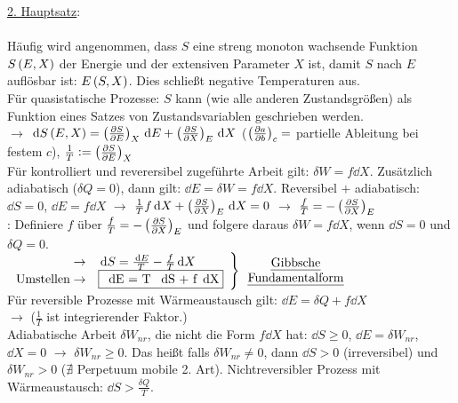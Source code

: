 \uline{2. Hauptsatz}:\\
\\
Häufig wird angenommen, dass $S$ eine streng monoton wachsende Funktion $S\left( E,X \right)$ der Energie und der extensiven Parameter $X$ ist, damit $S$ nach $E$ auflösbar ist: $E\left( S,X \right)$. Dies schließt negative Temperaturen aus.\\
Für quasistatische Prozesse: $S$ kann (wie alle anderen Zustandsgrößen) als Funktion eines Satzes von Zustandsvariablen geschrieben werden.\\
$\rightarrow$ $\,\text d{S}\left( E,X \right) = \left(\frac{\partial S}{\partial E}\right)_{X} \,\text d{E} + \left(\frac{\partial S}{\partial X}\right)_{E}\,\text d{X}$ ($\left(\frac{\partial a}{\partial b}\right)_{c} =$ partielle Ableitung bei festem $c$), $\frac{1}{T} \vcentcolon = \left(\frac{\partial S}{\partial E}\right)_{X}$\\
Für kontrolliert und reverersibel zugeführte Arbeit gilt: $\delta W = f\dd{X}$. Zusätzlich adiabatisch ($\delta Q =0$), dann gilt: $\dd{E}= \delta W = f\dd{X}$. Reversibel $+$ adiabatisch: $\dd{S} = 0$, $\dd{E} = f\dd{X}$ $\rightarrow$ $\frac{1}{T}f\,\text d{X} +\left(\frac{\partial S}{\partial X}\right)_{E}\,\text d{X} = 0$ $\rightarrow$ $\frac{f}{T} = -\left(\frac{\partial S}{\partial X}\right)_{E}$\\
: Definiere $f$ über $\frac{f}{T} = -\left(\frac{\partial S}{\partial X}\right)_{E}$ und folgere daraus $\delta W = f\dd{X}$, wenn $\dd{S} = 0$ und $\delta Q= 0$.\\
$\left.\begin{array}{r l}\rightarrow & \dd{S} = \frac{\dd{E}}{T} - \frac{f}{T} \dd{X}\\ \text{Umstellen} \rightarrow & \text{\fbox{\dd{E} = T \dd{S} + f\dd{X}}}\end{array}\right\}\begin{array}{c}\text{\uline{Gibbsche}}\\\text{\uline{Fundamentalform}}\end{array}$\\
Für reversible Prozesse mit Wärmeaustausch gilt: $\dd{E} = \delta Q + f\dd{X}$\\
$\rightarrow$  ($\frac{1}{T}$ ist integrierender Faktor.)\\
Adiabatische Arbeit $\delta W_{nr}$, die nicht die Form $f\dd{X}$ hat: $\dd{S} \geq 0$, $\dd{E} = \delta W_{nr}$, $\dd{X} = 0$ $\rightarrow$ $\delta W_{nr} \geq 0$. Das heißt falls $\delta W_{nr} \neq 0$, dann $\dd{S} > 0$ (irreversibel) und $\delta W_{nr} > 0$ ($\nexists$ Perpetuum mobile 2. Art). Nichtreversibler Prozess mit Wärmeaustausch: $\dd{S} > \frac{\delta Q}{T}$.\\
